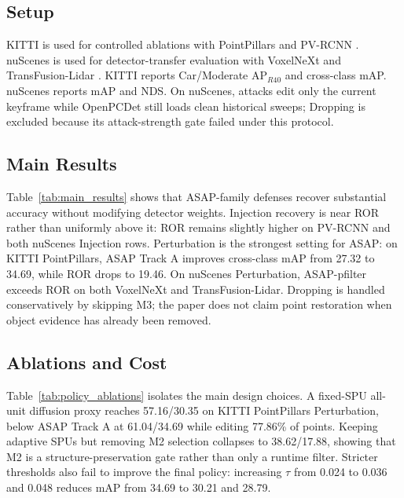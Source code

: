 \documentclass[conference]{IEEEtran}
\begin{document}
\subsection{Setup}

KITTI \cite{geiger2012kitti} is used for controlled ablations with PointPillars \cite{lang2019pointpillars} and PV-RCNN \cite{shi2020pvrcnn}. nuScenes \cite{caesar2020nuscenes} is used for detector-transfer evaluation with VoxelNeXt \cite{chen2023voxelnext} and TransFusion-Lidar \cite{bai2022transfusion}. KITTI reports Car/Moderate AP$_{R40}$ and cross-class mAP. nuScenes reports mAP and NDS. On nuScenes, attacks edit only the current keyframe while OpenPCDet still loads clean historical sweeps; Dropping is excluded because its attack-strength gate failed under this protocol.



\subsection{Main Results}

Table~\ref{tab:main_results} shows that ASAP-family defenses recover substantial accuracy without modifying detector weights. Injection recovery is near ROR rather than uniformly above it: ROR remains slightly higher on PV-RCNN and both nuScenes Injection rows. Perturbation is the strongest setting for ASAP: on KITTI PointPillars, ASAP Track A improves cross-class mAP from 27.32 to 34.69, while ROR drops to 19.46. On nuScenes Perturbation, ASAP-pfilter exceeds ROR on both VoxelNeXt and TransFusion-Lidar. Dropping is handled conservatively by skipping M3; the paper does not claim point restoration when object evidence has already been removed.

\subsection{Ablations and Cost}

Table~\ref{tab:policy_ablations} isolates the main design choices. A fixed-SPU all-unit diffusion proxy reaches 57.16/30.35 on KITTI PointPillars Perturbation, below ASAP Track A at 61.04/34.69 while editing 77.86\% of points. Keeping adaptive SPUs but removing M2 selection collapses to 38.62/17.88, showing that M2 is a structure-preservation gate rather than only a runtime filter. Stricter thresholds also fail to improve the final policy: increasing $\tau$ from 0.024 to 0.036 and 0.048 reduces mAP from 34.69 to 30.21 and 28.79.
\end{document}
